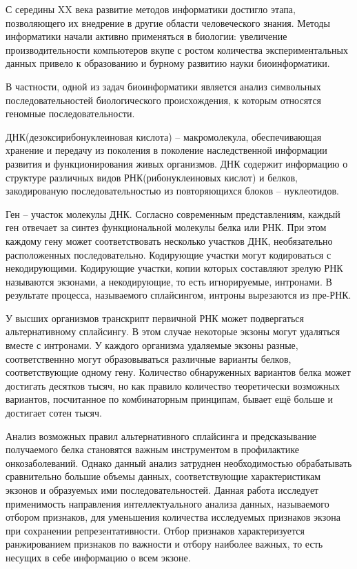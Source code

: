 С середины XX века развитие методов информатики достигло этапа, позволяющего их внедрение в другие области человеческого знания. Методы
информатики начали активно применяться в биологии: увеличение производительности компьютеров вкупе с ростом количества экспериментальных
данных привело к образованию и бурному развитию науки биоинформатики.

В частности, одной из задач биоинформатики является анализ символьных последовательностей биологического происхождения, к которым относятся геномные последовательности.

ДНК(дезоксирибонуклеиновая кислота) – макромолекула, обеспечивающая хранение и передачу из поколения в поколение наследственной информации развития и функционирования живых организмов. ДНК содержит информацию о структуре различных видов РНК(рибонуклеиновых кислот) и белков, закодированую последовательностью из повторяющихся блоков – нуклеотидов.

Ген -- участок молекулы ДНК. Согласно современным представлениям, каждый ген отвечает за синтез функциональной молекулы белка или РНК. При этом каждому гену может соответствовать несколько участков ДНК, необязательно расположенных последовательно. Кодирующие участки могут кодироваться с некодирующими. Кодирующие участки, копии которых составляют зрелую РНК называются экзонами, а некодирующие, то есть игнорируемые, интронами. В результате процесса, называемого сплайсингом, интроны вырезаются из пре-РНК.

У высших организмов транскрипт первичной РНК может подвергаться альтернативному сплайсингу. В этом случае некоторые экзоны могут удаляться вместе с интронами. У каждого организма удаляемые экзоны разные, соответственнно могут образовываться различные варианты белков, соответствующие одному гену. Количество обнаруженных вариантов белка может достигать десятков тысяч, но как правило количество теоретически возможных вариантов, посчитанное по комбинаторным принципам, бывает ещё больше и достигает сотен тысяч. 

Анализ возможных правил альтернативного сплайсинга и предсказывание получаемого белка становятся важным инструментом в профилактике онкозаболеваний. Однако данный анализ затруднен необходимостью обрабатывать сравнительно большие объемы данных, соответствующие характеристикам экзонов и образуемых ими последовательностей. Данная работа исследует применимость направления интеллектуального анализа данных, называемого отбором признаков, для уменьшения количества исследуемых признаков экзона при сохранении репрезентативности. Отбор признаков характеризуется ранжированием признаков по важности и отбору наиболее важных, то есть несущих в себе информацию о всем экзоне.

